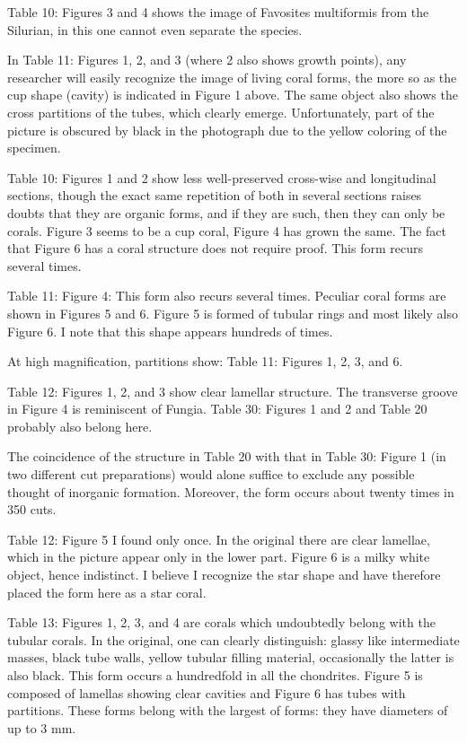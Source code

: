 \documentclass[a4paper, 11pt, oneside]{article}
\begin{document}
Table 10: Figures 3 and 4 shows the image of Favosites multiformis from the Silurian, in this one cannot even separate the species.

In Table 11: Figures 1, 2, and 3 (where 2 also shows growth points), any researcher will easily recognize the image of living coral forms, the more so as the cup shape (cavity) is indicated in Figure 1 above. The same object also shows the cross partitions of the tubes, which clearly emerge. Unfortunately, part of the picture is obscured by black in the photograph due to the yellow coloring of the specimen.

Table 10: Figures 1 and 2 show less well-preserved cross-wise and longitudinal sections, though the exact same repetition of both in several sections raises doubts that they are organic forms, and if they are such, then they can only be corals. Figure 3 seems to be a cup coral, Figure 4 has grown the same. The fact that Figure 6 has a coral structure does not require proof. This form recurs several times.

Table 11: Figure 4: This form also recurs several times. Peculiar coral forms are shown in Figures 5 and 6. Figure 5 is formed of tubular rings and most likely also Figure 6. I note that this shape appears hundreds of times.

At high magnification, partitions show: Table 11: Figures 1, 2, 3, and 6.

Table 12: Figures 1, 2, and 3 show clear lamellar structure. The transverse groove in Figure 4 is reminiscent of Fungia. Table 30: Figures 1 and 2 and Table 20 probably also belong here.

The coincidence of the structure in Table 20 with that in Table 30: Figure 1 (in two different cut preparations) would alone suffice to exclude any possible thought of inorganic formation. Moreover, the form occurs about twenty times in 350 cuts.

Table 12: Figure 5 I found only once. In the original there are clear lamellae, which in the picture appear only in the lower part. Figure 6 is a milky white object, hence indistinct. I believe I recognize the star shape and have therefore placed the form here as a star coral.

Table 13: Figures 1, 2, 3, and 4 are corals which undoubtedly belong with the tubular corals. In the original, one can clearly distinguish: glassy like intermediate masses, black tube walls, yellow tubular filling material, occasionally the latter is also black. This form occurs a hundredfold in all the chondrites. Figure 5 is composed of lamellas showing clear cavities and Figure 6 has tubes with partitions. These forms belong with the largest of forms: they have diameters of up to 3 mm.
\end{document}
